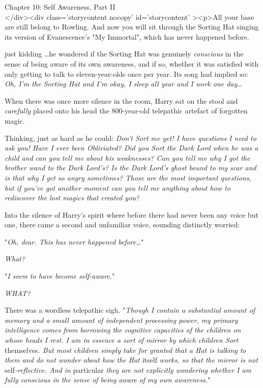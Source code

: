 
Chapter 10: Self Awareness, Part II\\
</div><div  class='storycontent nocopy' id='storycontent' ><p>All your base are 
still belong to Rowling.
\sbreak
And now you will sit through the Sorting Hat singing its version of 
Evanescence's "My Immortal", which has never happened before.

just kidding
\sbreak
{\ldots}he wondered if the Sorting Hat was genuinely \emph{conscious} in the 
sense of being aware of its own awareness, and if so, whether it was satisfied 
with only getting to talk to eleven-year-olds once per year. Its song had 
implied so: \emph{Oh, I'm the Sorting Hat and I'm okay, I sleep all year and I 
work one day{\ldots}}

When there was once more silence in the room, Harry sat on the stool and 
\emph{carefully} placed onto his head the 800-year-old telepathic artefact of 
forgotten magic.

Thinking, just as hard as he could: \emph{Don't Sort me yet! I have questions I 
need to ask you! Have I ever been Obliviated? Did you Sort the Dark Lord when 
he was a child and can you tell me about his weaknesses? Can you tell me why I 
got the brother wand to the Dark Lord's? Is the Dark Lord's ghost bound to my 
scar and is that why I get so angry sometimes? Those are the most important 
questions, but if you've got another moment can you tell me anything about how 
to rediscover the lost magics that created you?}

Into the silence of Harry's spirit where before there had never been any voice 
but one, there came a second and unfamiliar voice, sounding distinctly worried:

"\emph{Oh, dear. This has never happened before{\ldots}}"

\emph{What?}

"\emph{I seem to have become self-aware.}"

\emph{WHAT?}

There was a wordless telepathic sigh. "\emph{Though I contain a substantial 
amount of memory and a small amount of independent processing power, my primary 
intelligence comes from borrowing the cognitive capacities of the children on 
whose heads I rest. I am in essence a sort of mirror by which children Sort} 
themselves\emph{. But most children simply take for granted that a Hat is 
talking to them and do not wonder about how the Hat} itself\emph{ works, so 
that the mirror is not} self\emph{-reflective. And in} particular\emph{ they 
are not explicitly wondering whether I am fully conscious in the sense of being 
aware of my own awareness.}"


